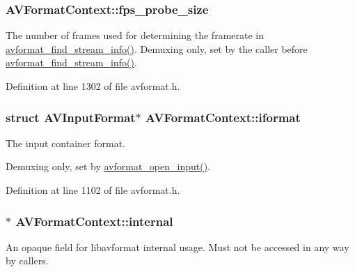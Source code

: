 \subsubsection[{\texorpdfstring{fps\+\_\+probe\+\_\+size}{fps_probe_size}}]{ A\+V\+Format\+Context\+::fps\+\_\+probe\+\_\+size}\hypertarget{struct_a_v_format_context_a517e6b5dcada506a49ef413d4d8d477a}{}\label{struct_a_v_format_context_a517e6b5dcada506a49ef413d4d8d477a}
The number of frames used for determining the framerate in \hyperlink{group__lavf__decoding_gad42172e27cddafb81096939783b157bb}{avformat\+\_\+find\+\_\+stream\+\_\+info()}. Demuxing only, set by the caller before \hyperlink{group__lavf__decoding_gad42172e27cddafb81096939783b157bb}{avformat\+\_\+find\+\_\+stream\+\_\+info()}. 

Definition at line 1302 of file avformat.\+h.

\subsubsection[{\texorpdfstring{iformat}{iformat}}]{\setlength{\rightskip}{0pt plus 5cm}struct {\bf A\+V\+Input\+Format}$\ast$ A\+V\+Format\+Context\+::iformat}\hypertarget{struct_a_v_format_context_a78efc5a53c21c8d81197445207ac4374}{}\label{struct_a_v_format_context_a78efc5a53c21c8d81197445207ac4374}
The input container format.

Demuxing only, set by \hyperlink{group__lavf__decoding_ga10a404346c646e4ab58f4ed798baca32}{avformat\+\_\+open\+\_\+input()}. 

Definition at line 1102 of file avformat.\+h.

\subsubsection[{\texorpdfstring{internal}{internal}}]{$\ast$ A\+V\+Format\+Context\+::internal}\hypertarget{struct_a_v_format_context_a8a8bec51da36db65ff864f88a85805d9}{}\label{struct_a_v_format_context_a8a8bec51da36db65ff864f88a85805d9}
An opaque field for libavformat internal usage. Must not be accessed in any way by callers. 

